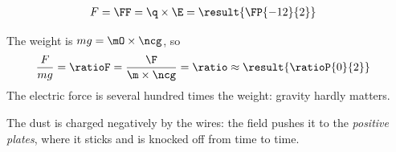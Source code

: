 \begin{abcliste}
\abc
\begin{align}
 F &= \FF = \q\times\E = \result{\FP{-12}{2}}
\end{align}

\abc The weight is $m g = \mO\times\ncg$, so
\begin{align}
 \frac{F}{m g} &= \ratioF = \frac{\F}{\m\times\ncg} = \ratio \approx \result{\ratioP{0}{2}}
\end{align}
The electric force is several hundred times the weight: gravity hardly matters.

\abc The dust is charged negatively by the wires: the field pushes it to the \emph{positive plates}, where it sticks and is knocked off from time to time.
\end{abcliste}
